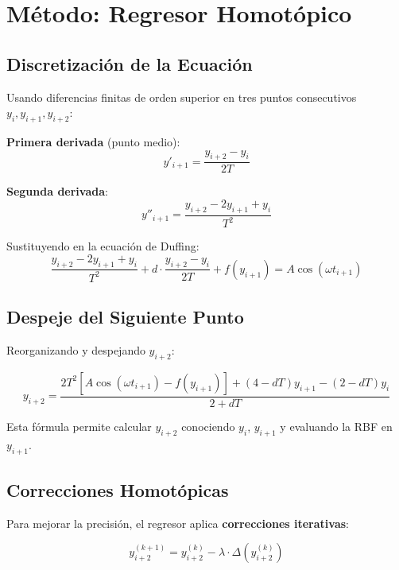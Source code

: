 \documentclass[11pt,a4paper]{article}
\begin{document}
\section{Método: Regresor Homotópico}

\subsection{Discretización de la Ecuación}

Usando diferencias finitas de orden superior en tres puntos consecutivos $y_i, y_{i+1}, y_{i+2}$:

\textbf{Primera derivada} (punto medio):
\begin{equation}
y'_{i+1} = \frac{y_{i+2} - y_i}{2T}
\end{equation}

\textbf{Segunda derivada}:
\begin{equation}
y''_{i+1} = \frac{y_{i+2} - 2y_{i+1} + y_i}{T^2}
\end{equation}

Sustituyendo en la ecuación de Duffing:
\begin{equation}
\frac{y_{i+2} - 2y_{i+1} + y_i}{T^2} + d \cdot \frac{y_{i+2} - y_i}{2T} + f(y_{i+1}) = A \cos(\omega t_{i+1})
\end{equation}

\subsection{Despeje del Siguiente Punto}

Reorganizando y despejando $y_{i+2}$:

\begin{equation}
y_{i+2} = \frac{2T^2 [A \cos(\omega t_{i+1}) - f(y_{i+1})] + (4 - dT)y_{i+1} - (2 - dT)y_i}{2 + dT}
\end{equation}

Esta fórmula permite calcular $y_{i+2}$ conociendo $y_i$, $y_{i+1}$ y evaluando la RBF en $y_{i+1}$.

\subsection{Correcciones Homotópicas}

Para mejorar la precisión, el regresor aplica \textbf{correcciones iterativas}:

\begin{equation}
y_{i+2}^{(k+1)} = y_{i+2}^{(k)} - \lambda \cdot \Delta(y_{i+2}^{(k)})
\end{equation}
\end{document}
